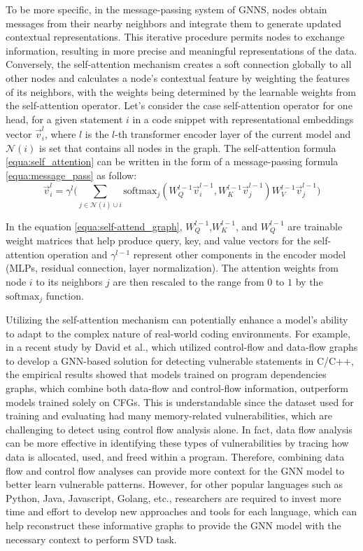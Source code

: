 \documentclass{ieeeaccess}
\begin{document}
\par To be more specific, in the message-passing system of GNNS, nodes obtain messages from their nearby neighbors and integrate them to generate updated contextual representations. This iterative procedure permits nodes to exchange information, resulting in more precise and meaningful representations of the data. Conversely, the self-attention mechanism creates a soft connection globally to all other nodes and calculates a node's contextual feature by weighting the features of its neighbors, with the  weights being determined by the learnable weights from the self-attention operator. Let's consider the case  self-attention operator for one head, for a given statement $i$ in a code snippet with representational embeddings vector $\Vec{v}^l_i$, where $l$ is the $l$-th transformer encoder layer of the current model and $\mathcal{N}(i)$ is set that contains all nodes in the graph. The self-attention formula \ref{equa:self_attention} can be written in the form of a message-passing formula \ref{equa:message_pass} as follow:
\begin{equation} \label{equa:self-attend_graph}
\Vec{v}^{l}_i = \gamma^l\bigg(\sum_{j\in \mathcal{N}(i)\cup i} \text{softmax}_j(W_Q^{l-1} \Vec{v}^{l-1}_i, W_K^{l-1} \Vec{v}^{l-1}_j) W_V^{l-1} \Vec{v}^{l-1}_j \bigg)
\end{equation}
\par In the equation \ref{equa:self-attend_graph}, $W_Q^{l-1}$,$W_K^{l-1}$, and $W_Q^{l-1}$ are trainable weight matrices that help produce query, key, and value vectors for the self-attention operation and  $\gamma^{l-1}$  represent other components in the encoder model (MLPs, residual connection, layer normalization). The attention weights from node $i$ to its neighbors $j$ are then rescaled to the range from $0$ to $1$ by the $\text{softmax}_j$  function.
\par  Utilizing the self-attention mechanism can potentially enhance a model's ability to adapt to the complex nature of real-world coding environments. For example, in a recent study by David et al., \cite{Linevd} which utilized control-flow and data-flow graphs to develop a GNN-based solution for detecting vulnerable statements in C/C++, the empirical results showed that models trained on program dependencies graphs, which combine both data-flow and control-flow information, outperform models trained solely on CFGs. This is understandable since the dataset used for training and evaluating  had many memory-related vulnerabilities, which are challenging to detect using control flow analysis alone. In fact, data flow analysis can be more effective in identifying these types of vulnerabilities by tracing how data is allocated, used, and freed within a program. Therefore, combining data flow and control flow analyses can provide more context for the GNN model to better learn vulnerable patterns. However, for other popular languages such as Python, Java, Javascript, Golang, etc.,  researchers are required to invest more time and effort to develop new approaches and tools for each language, which can help reconstruct these informative graphs to provide the GNN model with the necessary context to perform SVD task.
\end{document}
